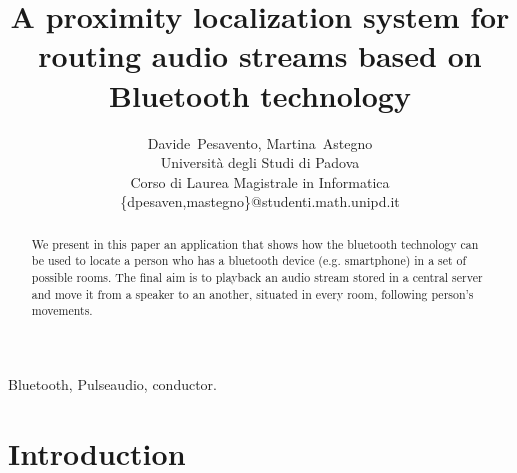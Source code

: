 \documentclass[conference]{./IEEEtran}
\begin{document}
\title{A proximity localization system for routing audio streams based on Bluetooth technology}
\author{Davide~Pesavento, Martina~Astegno \\
		Universit\`{a} degli Studi di Padova \\
		Corso di Laurea Magistrale in Informatica\\
		\{dpesaven,mastegno\}@studenti.math.unipd.it

}

\maketitle


\begin{abstract}
We present in this paper an application that shows how the bluetooth technology can be used to locate a person who has a bluetooth device (e.g. smartphone) in a set of possible rooms.  The final aim is to playback an audio stream stored in a central server and move it from a speaker to an another, situated in every room, following person's movements.
\end{abstract}

\begin{IEEEkeywords}%
Bluetooth, Pulseaudio, conductor.
\end{IEEEkeywords}




%
\IEEEpeerreviewmaketitle



\section{Introduction}
\end{document}
